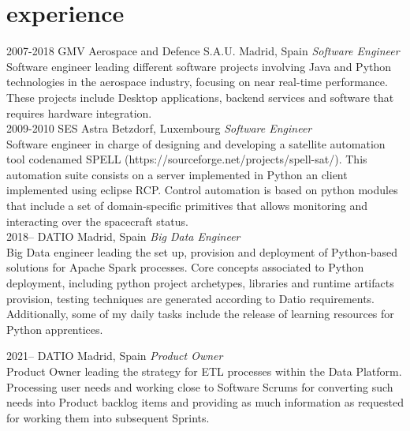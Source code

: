 \documentclass[]{friggeri-cv}
\begin{document}
\clearpage
\section{experience}

\begin{entrylist}
\entry
{2007-2018}
{GMV Aerospace and Defence S.A.U.}
{Madrid, Spain}
{\emph{Software Engineer} \\
Software engineer leading different software projects involving Java and Python technologies in the aerospace industry, focusing on near real-time performance.
These projects include Desktop applications, backend services and software that requires hardware integration.} \\


\entry
{2009-2010}
{SES Astra}
{Betzdorf, Luxembourg}
{\emph{Software Engineer} \\
Software engineer in charge of designing and developing a satellite automation tool codenamed SPELL (https://sourceforge.net/projects/spell-sat/).
This automation suite consists on a server implemented in Python an client implemented using eclipse RCP.
Control automation is based on python modules that include a set of domain-specific primitives that allows monitoring and interacting over the
spacecraft status.} \\


\entry
{2018--}
{DATIO}
{Madrid, Spain}
{\emph{Big Data Engineer} \\
Big Data engineer leading the set up, provision and deployment of Python-based solutions for Apache Spark processes.
Core concepts associated to Python deployment, including python project archetypes, libraries and runtime artifacts provision, testing techniques are
generated according to Datio requirements. Additionally, some of my daily tasks include the release of learning resources for Python apprentices.}


\entry
{2021--}
{DATIO}
{Madrid, Spain}
{\emph{Product Owner} \\
Product Owner leading the strategy for ETL processes within the Data Platform.
Processing user needs and working close to Software Scrums for converting such needs into Product backlog items and providing as much information as requested for working them into subsequent Sprints.}


\end{entrylist}
\end{document}
